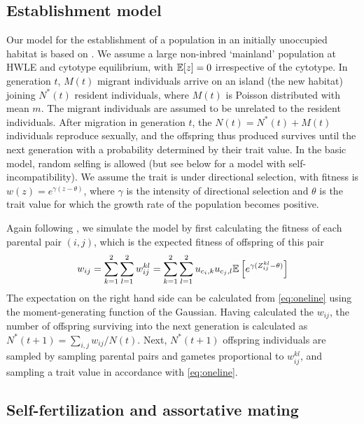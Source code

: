 \documentclass[11pt,a4paper]{article}
\begin{document}
\subsection*{Establishment model}

Our model for the establishment of a population in an initially unoccupied
habitat is based on \cite{barton2018}.
We assume a large non-inbred `mainland' population at HWLE and cytotype
equilibrium, with $\mathbb{E}[z] = 0$ irrespective of the cytotype.
In generation $t$, $M(t)$ migrant individuals arrive on an island (the new
habitat) joining $N^\ast(t)$ resident individuals, where $M(t)$ is Poisson
distributed with mean $m$. 
The migrant individuals are assumed to be unrelated to the resident
individuals.
After migration in generation $t$, the $N(t) = N^\ast(t) + M(t)$ individuals
reproduce sexually, and the offspring thus produced survives until the next
generation with a probability determined by their trait value.
In the basic model, random selfing is allowed (but see below for a model with
self-incompatibility).
We assume the trait is under directional selection, with fitness is $w(z) =
e^{\gamma(z - \theta)}$, where $\gamma$ is the intensity of directional
selection and $\theta$ is the trait value for which the growth rate of the
population becomes positive.

Again following \cite{barton2018}, we simulate the model by first calculating
the fitness of each parental pair $(i,j)$, which is the expected fitness of
offspring of this pair
\begin{equation}
  w_{ij}
    = \sum_{k=1}^2\sum_{l=1}^2 w_{ij}^{kl}
    = \sum_{k=1}^2\sum_{l=1}^2 u_{c_{i},k}u_{c_{j},l}
        \mathbb{E}\left[e^{\gamma(Z_{ij}^{kl} - \theta)}\right]
\end{equation}
The expectation on the right hand side can be calculated from \cref{eq:oneline}
using the moment-generating function of the Gaussian.
Having calculated the $w_{ij}$, the number of offspring surviving into the next
generation is calculated as $N^\ast(t+1) = \sum_{i,j}w_{ij}/N(t)$.
Next, $N^\ast(t+1)$ offspring individuals are sampled by sampling parental
pairs and gametes proportional to $w_{ij}^{kl}$, and sampling a trait value
in accordance with \cref{eq:oneline}. 


\subsection*{Self-fertilization and assortative mating}
\end{document}
